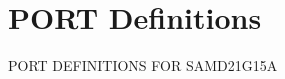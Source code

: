 \hypertarget{group___s_a_m_d21_g15_a__port}{}\section{P\+O\+RT Definitions}
\label{group___s_a_m_d21_g15_a__port}
P\+O\+RT D\+E\+F\+I\+N\+I\+T\+I\+O\+NS F\+OR S\+A\+M\+D21\+G15A 